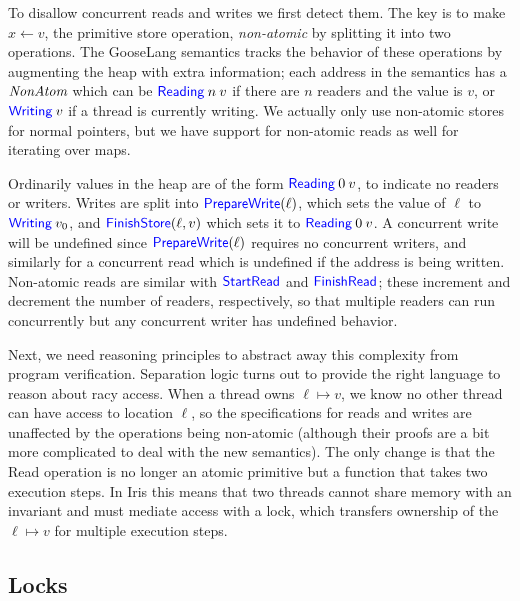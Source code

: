 To disallow concurrent reads and writes we first detect them. The key is to make
$x \gets v$, the primitive store operation, \emph{non-atomic} by splitting it
into two operations. The GooseLang semantics tracks the behavior of these
operations by augmenting the heap with extra information; each address in the
semantics has a $\textit{NonAtom}$ which can be
$\mathsf{\textcolor{blue}{Reading}} \: n \: v$ if there are $n$ readers and the value is $v$,
or $\mathsf{\textcolor{blue}{Writing}} \: v$ if a thread is currently writing. We actually only
use non-atomic stores for normal pointers, but we have support for non-atomic
reads as well for iterating over maps.

Ordinarily values in the heap are of the form $\mathsf{\textcolor{blue}{Reading}} \: 0 \: v$,
to indicate no readers or writers. Writes are split into
$\mathsf{\textcolor{blue}{PrepareWrite}}(\ell)$, which sets the value of $\ell$ to
$\mathsf{\textcolor{blue}{Writing}} \: v_{0}$, and $\mathsf{\textcolor{blue}{FinishStore}}(\ell, v)$ which sets
it to $\mathsf{\textcolor{blue}{Reading}} \: 0 \: v$. A concurrent write will be undefined
since $\mathsf{\textcolor{blue}{PrepareWrite}}(\ell)$ requires no concurrent writers, and
similarly for a concurrent read which is undefined if the address is being
written. Non-atomic reads are similar with $\mathsf{\textcolor{blue}{StartRead}}$ and
$\mathsf{\textcolor{blue}{FinishRead}}$; these increment and decrement the number of readers,
respectively, so that multiple readers can run concurrently but any concurrent
writer has undefined behavior.

Next, we need reasoning principles to abstract away this complexity from
program verification. Separation logic turns out to provide the right
language to reason about racy access. When a thread owns
$\ell \mapsto v$, we know no other thread can have access to location
$\ell$, so the specifications for reads and writes are unaffected by the
operations being non-atomic (although their proofs are a bit more
complicated to deal with the new semantics). The only change is that the
Read operation is no longer an atomic primitive but a function that
takes two execution steps. In Iris this means that two threads cannot
share memory with an invariant and must mediate access with a lock,
which transfers ownership of the $\ell \mapsto v$ for multiple execution
steps.

\subsection{Locks}

\newcommand{\Acquire}{\goosedef{Acquire}}
\newcommand{\CAS}{\goosedef{CAS}}

